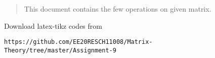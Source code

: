 \documentclass[journal,12pt,twocolumn]{IEEEtran}
\begin{document}
% 
\maketitle
\newpage
\bigskip
\renewcommand{\thefigure}{\theenumi}
\renewcommand{\thetable}{\theenumi}
%
%
\begin{abstract}
This document contains the few operations on given matrix.
\end{abstract}
Download latex-tikz codes from 
%
\begin{lstlisting}
https://github.com/EE20RESCH11008/Matrix-Theory/tree/master/Assignment-9
\end{lstlisting}
\end{document}
